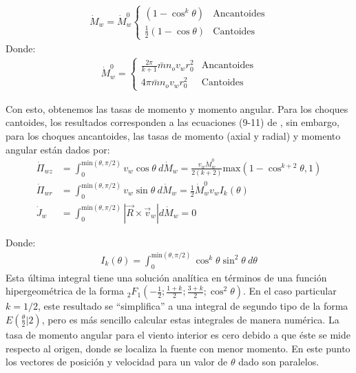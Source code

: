 \begin{align}
  \dot{M}_w = \dot{M}^0_w\left\lbrace
  \begin{array}{lr}
    \left(1 - \cos^k\theta\right) & \mathrm{Ancantoides} \\
    \frac{1}{2} \left(1 - \cos\theta\right) & \mathrm{Cantoides}
  \end{array}\right. \label{eq:inner-dot-M}
\end{align}
Donde:
\begin{align}
  \dot{M}^0_w = \left\lbrace
  \begin{array}{lr}
    \frac{2\pi}{k+1}\bar{m}n_o v_w r_0^2 & \mathrm{Ancantoides} \\
    4\pi \bar{m}n_o v_w r_0^2 & \mathrm{Cantoides}
  \end{array}\right.
\end{align}

Con esto, obtenemos las tasas de momento y momento angular. Para los choques cantoides, los resultados corresponden a las ecuaciones (9-11) de \CRW{}, sin embargo, para los choques ancantoides, las tasas de momento (axial y radial) y momento angular están dados por:
\begin{align}
  \dot{\Pi}_{wz} &= \int^{\mathrm{min}(\theta, \pi/2)}_0 v_w\cos\theta~d\dot{M}_w = \frac{v_w \dot{M}^0_w}{2\left(k+2\right)}\mathrm{max}\left(1 - \cos^{k+2}\theta, 1\right) \label{eq:Pi-wz} \\
  \dot{\Pi}_{wr} &= \int^{\mathrm{min}(\theta, \pi/2)}_0 v_w\sin\theta~d\dot{M}_w = \frac{1}{2}\dot{M}^0_w v_w I_k(\theta) \\
  \dot{J}_w &= \int^{\mathrm{min}(\theta, \pi/2)}_0 |\vec{R} \times \vec{v}_w|d\dot{M}_w = 0 \label{eq:inner-dot-J}
\end{align}

Donde:
\begin{align}
  I_k(\theta) = \int^{\mathrm{min}(\theta, \pi/2)}_0 \cos^k\theta \sin^2\theta~d\theta \label{eq:Ikt}
\end{align}
 Esta última integral tiene una solución analítica en términos de una función hipergeométrica de la forma ${}_2F_1\left(-\frac{1}{2}; \frac{1+k}{2}; \frac{3+k}{2}; \cos^2\theta\right)$. En el caso particular $k=1/2$, este resultado se ``simplifica'' a una integral de segundo tipo de la forma $E\left(\frac{\theta}{2} | 2\right)$, pero es más sencillo calcular estas integrales de manera numérica. La tasa de momento angular para el viento interior es cero debido a que éste se mide respecto al origen, donde se localiza la fuente con menor momento. En este punto los vectores de posición y velocidad para un valor de $\theta$ dado son paralelos.

